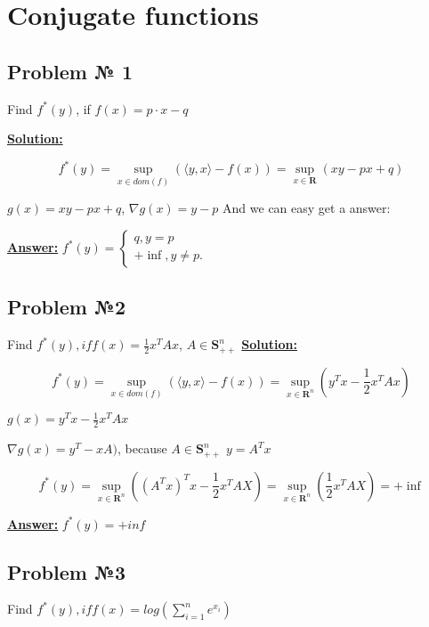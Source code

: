 \section{Conjugate functions}

\subsection{Problem № 1} Find $f^*(y)$, if $f(x) = p \cdot x - q$

\underline{\textbf{Solution:}}

\begin{equation*}
    f^*(y) = \sup_{x \in dom(f)} \left( 
    \langle y, x \rangle - f(x) \right) = \sup_{x \in \mathbf{R}} \left( xy - px + q\right)
\end{equation*}

$g(x) = xy - px + q$, $\nabla g(x) = y - p$
And we can easy get a answer:

\underline{\textbf{Answer:}} $f^*(y) = \begin{cases}
   q, y = p \\
   +\inf , y \ne p.
 \end{cases}$

\subsection{Problem №2}
Find $f^*(y), if f(x) = \frac{1}{2}x^TAx$, $A \in \mathbf{S}_{++}^n$
\underline{\textbf{Solution:}}

\begin{equation*}
    f^*(y) = \sup_{x \in dom(f)} \left( 
    \langle y, x \rangle - f(x) \right) = \sup_{x \in \mathbf{R}^n} \left( y^Tx - \frac{1}{2}x^TAx\right)
\end{equation*}

$g(x) = y^Tx - \frac{1}{2}x^TAx$

$\nabla g(x) = y^T - xA )$, because $A \in \mathbf{S}_{++}^n$
$y = A^Tx$

\begin{equation*}
    f^*(y) = \sup_{x \in \mathbf{R}^n}\left( (A^Tx)^Tx - \frac{1}{2}x^TAX\right) = \sup_{x \in \mathbf{R}^n}\left( \frac{1}{2}x^TAX\right) = +\inf
\end{equation*}

\underline{\textbf{Answer:}} $f^*(y) = +inf$

\subsection{Problem №3}
Find $f^*(y), if f(x) = log \left( \sum\limits_{i=1}^n e^{x_i}\right)$


